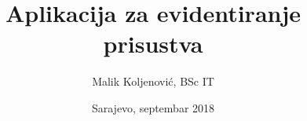 \documentclass[a4paper,11pt,titlepage]{report}
\title{Aplikacija za evidentiranje prisustva}
\author{Malik Koljenović, BSc IT}
\date{Sarajevo, septembar 2018}
\newcommand\blankpage{%
    \null
    \thispagestyle{empty}%
    \addtocounter{page}{-1}%
    \newpage}
\begin{document}
	
  	
	
	\tableofcontents
	\listoffigures
    \glsaddall
	\printglossaries
	
	
	
	
	
	
	\begin{appendices}
		
%		
%		
		
	\end{appendices}
	
	
	
\end{document}
